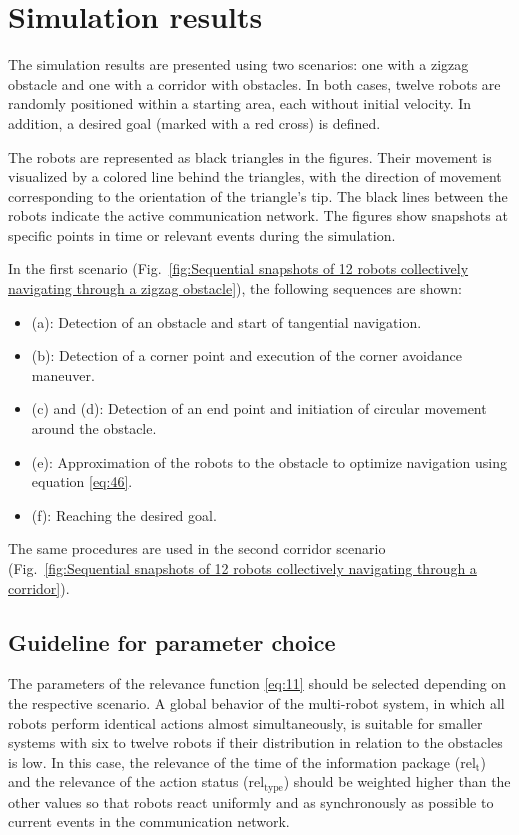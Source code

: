 \documentclass[conference]{IEEEtran}
\begin{document}
\section{Simulation results}
The simulation results are presented using two scenarios: 
one with a zigzag obstacle and one with a corridor with obstacles. 
In both cases, twelve robots are randomly 
positioned within a starting area, each without initial velocity. 
In addition, a desired goal (marked with a red cross) is defined.

The robots are represented as black triangles in the figures. 
Their movement is visualized by a colored line behind the triangles, 
with the direction of movement corresponding to the orientation of the triangle's tip. The black 
lines between the robots indicate the active communication network. 
The figures show snapshots at specific points in time or 
relevant events during the simulation.

In the first scenario (Fig.~\ref{fig:Sequential snapshots of 12 robots collectively navigating through a zigzag obstacle}), the following sequences are shown:
\begin{itemize}
\item (a): Detection of an obstacle and start of tangential navigation.
\item (b): Detection of a corner point and execution of the corner avoidance maneuver.
\item (c) and (d): Detection of an end point and initiation of circular movement around the obstacle.
\item (e): Approximation of the robots to the obstacle to optimize navigation using equation \eqref{eq:46}.
\item (f): Reaching the desired goal.
\end{itemize}

The same procedures are used in the second corridor scenario (Fig.~\ref{fig:Sequential snapshots of 12 robots collectively navigating through a corridor}).

\subsection*{Guideline for parameter choice}
The parameters of the relevance function \eqref{eq:11} should be selected depending on the 
respective scenario. A global behavior of the 
multi-robot system, in which all robots perform identical actions almost simultaneously,
 is suitable for smaller systems with six to twelve 
robots if their distribution in relation to the obstacles 
is low. In this case, the relevance of the time of the information package 
($\mathrm{rel}_{\mathrm{t}}$) and the relevance of the action status ($\mathrm{rel}_{\mathrm{type}}$) should be weighted higher 
than the other values so that robots react uniformly and as synchronously as possible
to current events in the communication network.
\end{document}
